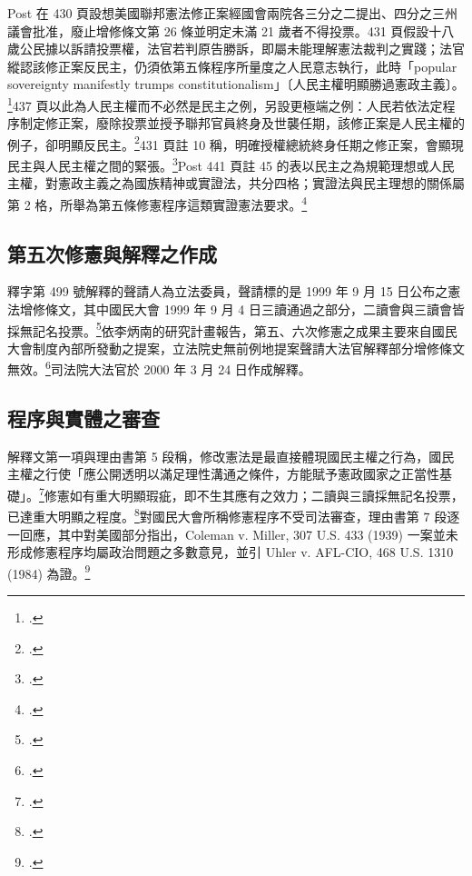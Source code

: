 Post 在 430 頁設想美國聯邦憲法修正案經國會兩院各三分之二提出、四分之三州議會批准，廢止增修條文第 26 條並明定未滿 21 歲者不得投票。431 頁假設十八歲公民據以訴請投票權，法官若判原告勝訴，即屬未能理解憲法裁判之實踐；法官縱認該修正案反民主，仍須依第五條程序所量度之人民意志執行，此時「popular sovereignty manifestly trumps constitutionalism」〔人民主權明顯勝過憲政主義〕。\footcite[430--431]{post1998}437 頁以此為人民主權而不必然是民主之例，另設更極端之例：人民若依法定程序制定修正案，廢除投票並授予聯邦官員終身及世襲任期，該修正案是人民主權的例子，卻明顯反民主。\footcite[437]{post1998}431 頁註 10 稱，明確授權總統終身任期之修正案，會顯現民主與人民主權之間的緊張。\footcite[431 n.10]{post1998}Post 441 頁註 45 的表以民主之為規範理想或人民主權，對憲政主義之為國族精神或實證法，共分四格；實證法與民主理想的關係屬第 2 格，所舉為第五條修憲程序這類實證憲法要求。\footcite[441 n.45]{post1998}

\subsection{第五次修憲與解釋之作成}

釋字第 499 號解釋的聲請人為立法委員，聲請標的是 1999 年 9 月 15 日公布之憲法增修條文，其中國民大會 1999 年 9 月 4 日三讀通過之部分，二讀會與三讀會皆採無記名投票。\footcites[理由書第 1 段]{jy499}[39--40]{li2001}依李炳南的研究計畫報告，第五、六次修憲之成果主要來自國民大會制度內部所發動之提案，立法院史無前例地提案聲請大法官解釋部分增修條文無效。\footcite[計畫前言 2；61]{li2001}司法院大法官於 2000 年 3 月 24 日作成解釋。

\subsection{程序與實體之審查}

解釋文第一項與理由書第 5 段稱，修改憲法是最直接體現國民主權之行為，國民主權之行使「應公開透明以滿足理性溝通之條件，方能賦予憲政國家之正當性基礎」。\footcite[解釋文第一項；理由書第 5 段]{jy499}修憲如有重大明顯瑕疵，即不生其應有之效力；二讀與三讀採無記名投票，已達重大明顯之程度。\footcite[理由書第 6 段]{jy499}對國民大會所稱修憲程序不受司法審查，理由書第 7 段逐一回應，其中對美國部分指出，Coleman v. Miller, 307 U.S. 433 (1939) 一案並未形成修憲程序均屬政治問題之多數意見，並引 Uhler v. AFL-CIO, 468 U.S. 1310 (1984) 為證。\footcite[理由書第 7 段]{jy499}


